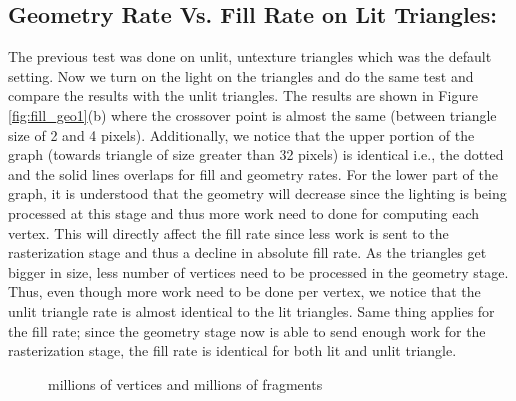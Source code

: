 \subsection{Geometry Rate Vs. Fill Rate on Lit Triangles:}\label{sec:lit}
The previous test was done on unlit, untexture triangles which was the default setting. Now we turn on the light on the triangles and do the same test and compare the results with the unlit triangles. The results are shown in Figure \ref{fig:fill_geo1}(b) where the crossover point is almost the same (between triangle size of 2 and 4 pixels). Additionally, we notice that the upper portion of the graph (towards triangle of size greater than 32 pixels) is identical i.e., the dotted and the solid lines overlaps for fill and geometry rates. For the lower part of the graph, it is understood that the geometry will decrease since the lighting is being processed at this stage and thus more work need to done for computing each vertex. This will directly affect the fill rate since less work is sent to the rasterization stage and thus a decline in absolute fill rate. As the triangles get bigger in size, less number of vertices need to be processed in the geometry stage. Thus, even though more work need to be done per vertex, we notice that the unlit triangle rate is almost identical to the lit triangles. Same thing applies for the fill rate; since the geometry stage now is able to send enough work for the rasterization stage, the fill rate is identical for both lit and unlit triangle. 

\begin{figure}[!tbh]
 \centering  
  \caption{millions of vertices and millions of fragments }
   \label{fig:fill_geo2}
\end{figure} 

